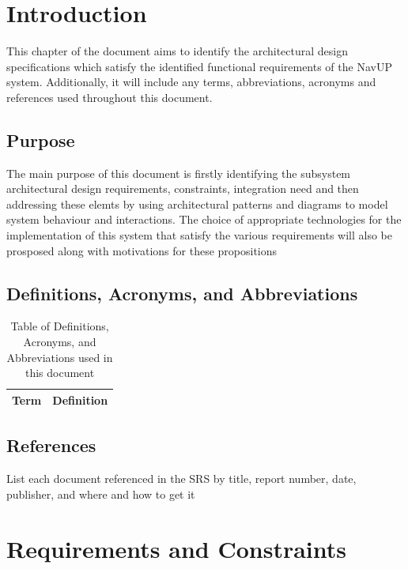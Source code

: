 \documentclass{article}
\begin{document}
	
	\section{Introduction}\label{sec:intro}
		This chapter of the document aims to identify the architectural design specifications which satisfy the identified functional requirements of the NavUP system. Additionally, it will include any terms, abbreviations, acronyms and references used throughout this document.
	
		\subsection{Purpose}\label{subsec:purpose}
			The main purpose of this document is firstly identifying the subsystem architectural design requirements, constraints, integration need  and then addressing these elemts by using architectural patterns and diagrams to model system behaviour and interactions. The choice of appropriate technologies for the implementation of this system that satisfy the various requirements will also be prosposed along with motivations for these propositions 
				
		\subsection{Definitions, Acronyms, and Abbreviations}\label{subsec:daa}
			\begin{table}[h!]
				\centering
				\caption{Table of Definitions, Acronyms, and Abbreviations used in this document}
				\label{tab: Table 1}
				\begin{tabular}{| m{4cm} | m{12cm} |}
					\hline
					\textbf{Term} & \textbf{Definition} \\
					\hline
					\hline
					
				\end{tabular}
			\end{table}
	
		\subsection{References}\label{subsec:references}
		List each document referenced in the SRS by title, report number, date, publisher, and where and how to get it
		
	\section{Requirements and Constraints}\label{sec:requirements}
\end{document}
